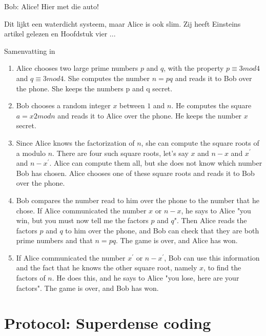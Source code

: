 \documentclass[../../main.tex]{subfiles}
\begin{document}
Bob: Alice! Hier met die auto!\vspace*{12pt}

Dit lijkt een waterdicht systeem, maar Alice is ook slim. Zij heeft Einsteins artikel gelezen en Hoofdstuk vier ...

Samenvatting in 
\begin{enumerate}
\item Alice chooses two large prime numbers $p$ and $q$, with the property $p\equiv 3 mod 4$ and $q \equiv 3mod4$. She computes the number $n=pq$ and reads it to Bob over the phone. She keeps the numbers p and q secret.

\item Bob chooses a random integer $x$ between $1$ and $n$. He computes the square $a= x2 mod n$ and reads it to Alice over the phone. He keeps the number $x$ secret.

\item Since Alice knows the factorization of $n$, she can compute the square roots of a modulo $n$. There are four such square roots, let's say $x$ and $n-x$ and $x^{\prime}$ and $n-x^{\prime}$. Alice can compute them all, but she does not know which number Bob has chosen. Alice chooses one of these square roots and reads it to Bob over the phone.

\item Bob compares the number read to him over the phone to the number that he chose. If Alice communicated the number $x$ or $n-x$, he says to Alice "you win, but you must now tell me the factors $p$ and $q$". Then Alice reads the factors $p$ and $q$ to him over the phone, and Bob can check that they are both prime numbers and that $n=pq$. The game is over, and Alice has won.

\item If Alice communicated the number $x^{\prime}$ or $n-x^{\prime}$, Bob can use this information and the fact that he knows the other square root, namely $x$, to find the factors of $n$. He does this, and he says to Alice "you lose, here are your factors". The game is over, and Bob has won.
\end{enumerate}
\fi%



\clearpage
\section{Protocol: Superdense coding}\label{sec:poSuperdense}
\end{document}
